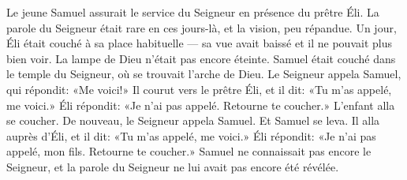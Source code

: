 Le jeune Samuel assurait le service du Seigneur en présence du prêtre Éli.
La parole du Seigneur était rare en ces jours-là, et la vision, peu répandue.
Un jour, Éli était couché à sa place habituelle
	--- sa vue avait baissé et il ne pouvait plus bien voir.
La lampe de Dieu n’était pas encore éteinte.
	Samuel était couché dans le temple du Seigneur, où se trouvait l’arche de Dieu.
Le Seigneur appela Samuel, qui répondit: «Me voici!»
Il courut vers le prêtre Éli, et il dit:
	«Tu m’as appelé, me voici.»
Éli répondit: «Je n’ai pas appelé. Retourne te coucher.»
	L’enfant alla se coucher.
De nouveau, le Seigneur appela Samuel. Et Samuel se leva.
Il alla auprès d’Éli, et il dit:
	«Tu m’as appelé, me voici.»
Éli répondit: «Je n’ai pas appelé, mon fils. Retourne te coucher.»
Samuel ne connaissait pas encore le Seigneur,
	et la parole du Seigneur ne lui avait pas encore été révélée.
